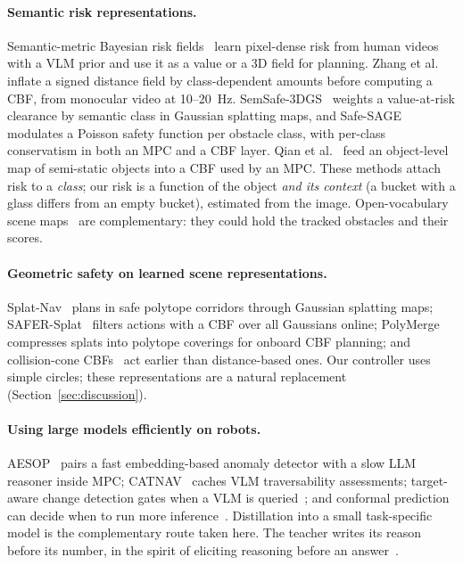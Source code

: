 \documentclass[10pt,a4paper]{article}
\begin{document}
\paragraph{Semantic risk representations.} Semantic-metric Bayesian risk fields~\cite{chen2025riskfields} learn pixel-dense risk from
human videos with a VLM prior and use it as a value or a 3D field for planning. Zhang et al.~\cite{zhang2026semanticdf} inflate a
signed distance field by class-dependent amounts before computing a CBF, from monocular video at 10--20~Hz. SemSafe-3DGS~\cite{khass2026semsafe}
weights a value-at-risk clearance by semantic class in Gaussian splatting maps, and Safe-SAGE~\cite{yang2026safesage} modulates a
Poisson safety function per obstacle class, with per-class conservatism in both an MPC and a CBF layer. Qian et
al.~\cite{qian2024closing} feed an object-level map of semi-static objects into a CBF used by an MPC. These methods attach risk to
a \emph{class}; our risk is a function of the object \emph{and its context} (a bucket with a glass differs from an empty bucket),
estimated from the image. Open-vocabulary scene maps~\cite{lilja2026scenelm,pham2026semanticmapping} are complementary: they could
hold the tracked obstacles and their scores.

\paragraph{Geometric safety on learned scene representations.} Splat-Nav~\cite{chen2025splatnav} plans in safe polytope corridors
through Gaussian splatting maps; SAFER-Splat~\cite{chen2025safersplat} filters actions with a CBF over all Gaussians online;
PolyMerge~\cite{hong2026polymerge} compresses splats into polytope coverings for onboard CBF planning; and collision-cone
CBFs~\cite{tscholl2025collisioncone} act earlier than distance-based ones. Our controller uses simple circles; these
representations are a natural replacement (Section~\ref{sec:discussion}).

\paragraph{Using large models efficiently on robots.} AESOP~\cite{sinha2024aesop} pairs a fast embedding-based anomaly detector with
a slow LLM reasoner inside MPC; CATNAV~\cite{potnis2026catnav} caches VLM traversability assessments; target-aware change
detection gates when a VLM is queried~\cite{baek_gating}; and conformal prediction can decide when to run more inference~\cite{wu_covnav}.
Distillation into a small task-specific model is the complementary route taken here. The teacher writes its reason before its
number, in the spirit of eliciting reasoning before an answer~\cite{wang2024cot}.
\end{document}
